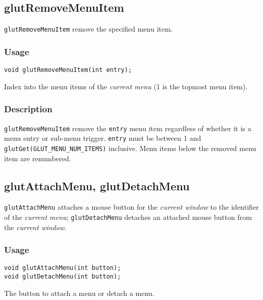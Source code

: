 \subsection{glutRemoveMenuItem}

{\tt glutRemoveMenuItem} remove the specified menu item.

\subsubsection*{Usage}
\begin{verbatim}
void glutRemoveMenuItem(int entry);
\end{verbatim}
\begin{description}
\itemsep 0in
\item[\tt entry]
Index into the menu items of the {\em current menu} (1 is the topmost
menu item).
\end{description}

\subsubsection*{Description}

{\tt glutRemoveMenuItem} remove the {\tt entry} menu item regardless of whether it
is a menu entry or sub-menu trigger.
{\tt entry} must be between 1 and {\tt glutGet(GLUT\_MENU\_NUM\_ITEMS)}
inclusive.
Menu items below the removed menu item are renumbered.

\subsection{glutAttachMenu, glutDetachMenu}

{\tt glutAttachMenu} attaches a mouse button for the {\em current window} to the identifier of
the {\em current menu}; {\tt glutDetachMenu} detaches an attached mouse button from the
{\em current window}.

\subsubsection*{Usage}
\begin{verbatim}
void glutAttachMenu(int button);
void glutDetachMenu(int button);
\end{verbatim}
\begin{description}
\itemsep 0in
\item[\tt button]
The button to attach a menu or detach a menu.
\end{description}

